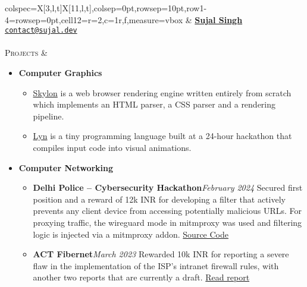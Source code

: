 \documentclass[11pt]{article}
\begin{document}
    \noindent%
    \begin{tblr}%
    {colspec={X[3,l,t]X[11,l,t]},colsep=0pt,rowsep=10pt,row{1-4}={rowsep=0pt},cell{1}{2}={r=2,c=1}{r,f},measure=vbox}%
        \href{https://github.com/sujaldev}{\faGithub}
        \hspace{5pt} \href{https://linkedin.com/in/sujal-singh}{\faLinkedin}
        \hspace{5pt} \href{https://youtube.com/@sujaldev}{\faYoutube}
        &
        \href{https://sujal.dev/}{\textbf{\Huge Sujal Singh}}
        \\
        \href{mailto:contact@sujal.dev}{\texttt{contact@sujal.dev}}
        \\ \\
        \textsc{\Large Projects} &
        \vspace*{-1.5\topsep}
        \begin{itemize}[topsep=0pt,leftmargin=15pt]
            \item \textbf{Computer Graphics}
            \begin{itemize}
                \item \href{https://github.com/sujaldev/skylon}{\color{blue}Skylon} is a web browser rendering engine
                written entirely from scratch which implements an HTML parser, a CSS parser and a rendering pipeline.
                \item \href{https://github.com/sujaldev/lyn}{\color{blue}Lyn} is a tiny programming language built at a
                24-hour hackathon that compiles input code into visual animations.
            \end{itemize}

            \item \textbf{Computer Networking}
            \begin{itemize}
                \item \textbf{Delhi Police -- Cybersecurity Hackathon}\hfill\textit{February 2024}\newline
                Secured first position and a reward of 12k INR for developing a filter that actively prevents any client
                device from accessing potentially malicious URLs. For proxying traffic, the wireguard mode in mitmproxy
                was used and filtering logic is injected via a mitmproxy addon.
                \href{https://github.com/sujaldev/cerberus}{\color{blue}Source Code}
                \item \textbf{ACT Fibernet}\hfill\textit{March 2023}\newline
                Rewarded 10k INR for reporting a severe flaw in the implementation of the ISP's intranet firewall rules,
                with another two reports that are currently a draft.
                \href{https://pdf.sujal.dev/act/report.pdf}{\color{blue} Read report}
            \end{itemize}


\end{itemize}
\end{tblr}
\end{document}
